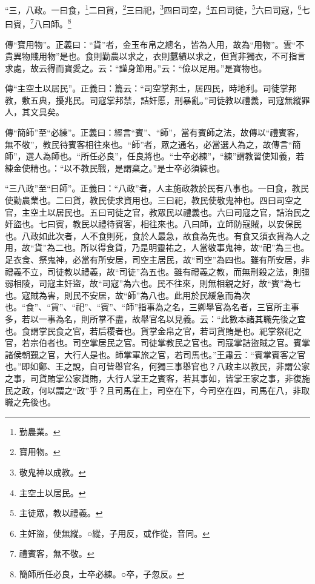 “三，八政。一曰食，\footnote{勤農業。}二曰貨，\footnote{寶用物。}三曰祀，\footnote{敬鬼神以成教。}四曰司空，\footnote{主空土以居民。}五曰司徒，\footnote{主徒眾，教以禮義。}六曰司寇，\footnote{主奸盜，使無縱。○縱，子用反，或作從，音同。}七曰賓，\footnote{禮賓客，無不敬。}八曰師。\footnote{簡師所任必良，士卒必練。○卒，子忽反。}

{\noindent\zhuan{}\fzbyks 傳“寶用物”。正義曰：“貨”者，金玉布帛之總名，皆為人用，故為“用物”。雲“不貴異物賤用物”是也。食則勤農以求之，衣則蠶績以求之，但貨非獨衣，不可指言求處，故云得而寶愛之。云：“謹身節用。”云：“儉以足用。”是寶物也。 \par}

{\noindent\zhuan{}\fzbyks 傳“主空土以居民”。正義曰：篇云：“司空掌邦土，居四民，時地利。司徒掌邦教，敷五典，擾兆民。司寇掌邦禁，詰奸慝，刑暴亂。”司徒教以禮義，司寇無縱罪人，其文具矣。 \par}

{\noindent\zhuan{}\fzbyks 傳“簡師”至“必練”。正義曰：經言“賓”、“師”，當有賓師之法，故傳以“禮賓客，無不敬”，教民待賓客相往來也。“師”者，眾之通名，必當選人為之，故傳言“簡師”，選人為師也。“所任必良”，任良將也。“士卒必練”，“練”謂教習使知義，若練金使精也。：“以不教民戰，是謂棄之。”是士卒必須練也。 \par}

{\noindent\shu{}\fzkt “三八政”至“曰師”。正義曰：“八政”者，人主施政教於民有八事也。一曰食，教民使勤農業也。二曰貨，教民使求資用也。三曰祀，教民使敬鬼神也。四曰司空之官，主空土以居民也。五曰司徒之官，教眾民以禮義也。六曰司寇之官，詰治民之奸盜也。七曰賓，教民以禮待賓客，相往來也。八曰師，立師防寇賊，以安保民也。八政如此次者，人不食則死，食於人最急，故食為先也。有食又須衣貨為人之用，故“貨”為二也。所以得食貨，乃是明靈祐之，人當敬事鬼神，故“祀”為三也。足衣食、祭鬼神，必當有所安居，司空主居民，故“司空”為四也。雖有所安居，非禮義不立，司徒教以禮義，故“司徒”為五也。雖有禮義之教，而無刑殺之法，則彊弱相陵，司寇主奸盜，故“司寇”為六也。民不往來，則無相親之好，故“賓”為七也。寇賊為害，則民不安居，故“師”為八也。此用於民緩急而為次也。“食”、“貨”、“祀”、“賓”、“師”指事為之名，三卿舉官為名者，三官所主事多，若以一事為名，則所掌不盡，故舉官名以見義。云：“此數本諸其職先後之宜也。食謂掌民食之官，若后稷者也。貨掌金帛之官，若司貨賄是也。祀掌祭祀之官，若宗伯者也。司空掌居民之官。司徒掌教民之官也。司寇掌詰盜賊之官。賓掌諸侯朝覲之官，大行人是也。師掌軍旅之官，若司馬也。”王肅云：“賓掌賓客之官也。”即如鄭、王之說，自可皆舉官名，何獨三事舉官也？八政主以教民，非謂公家之事，司貨賄掌公家貨賄，大行人掌王之賓客，若其事如，皆掌王家之事，非復施民之政，何以謂之“政”乎？且司馬在上，司空在下，今司空在四，司馬在八，非取職之先後也。 \par}

